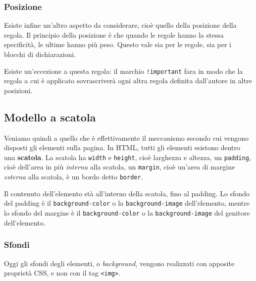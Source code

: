 \documentclass[a4paper,11pt]{article}
\begin{document}
\subsubsection{Posizione}
Esiste infine un'altro aspetto da considerare, cioè quello della posizione della regola.
Il principio della posizione è che quando le regole hanno la stessa specificità, le ultime hanno più peso.
Questo vale sia per le regole, sia per i blocchi di dichiarazioni.

Esiste un'eccezione a questa regola: il marchio \lstinline|!important| fara in modo che la regola a cui è applicato sovrascriverà ogni altra regola definita dall'autore in altre posizioni.

\subsection{Modello a scatola}
Veniamo quindi a quello che è effettivamente il meccanismo secondo cui vengono disposti gli elementi sulla pagina.
In HTML, tutti gli elementi esistono dentro una \textbf{scatola}.
La scatola ha \lstinline|width| e \lstinline|height|, cioè larghezza e altezza, un \lstinline|padding|, cioè dell'area in più \textit{interna} alla scatola, un \lstinline|margin|, cioè un'area di margine \textit{esterna} alla scatola, è un bordo detto \lstinline|border|.

Il contenuto dell'elemento stà all'interno della scatola, fino al padding.
Lo sfondo del padding è il \lstinline|background-color| o la \lstinline|background-image| dell'elemento, mentre lo sfondo del margine è il \lstinline|background-color| o la \lstinline|background-image| del genitore dell'elemento.

\begin{center}
\end{center}

\subsubsection{Sfondi}
Oggi gli sfondi degli elementi, o \textit{background}, vengono realizzati con apposite proprietà CSS, e non con il tag \lstinline|<img>|.
\end{document}
